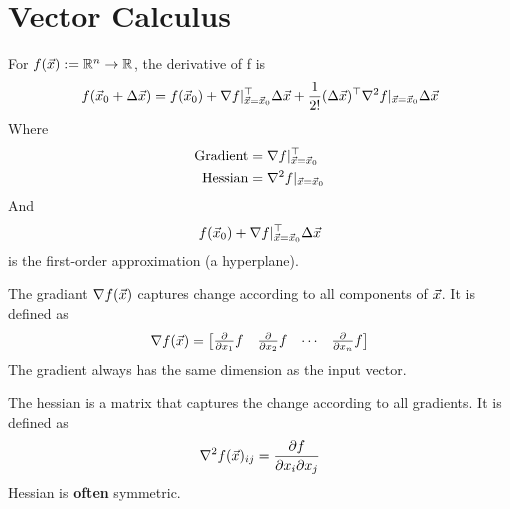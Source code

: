 \section{Vector Calculus} %
\label{sec:vector_calculus}

\begin{theorem}
	For $f(\v{x}):=\mathbb{R}^n\rightarrow\mathbb{R}$, the derivative of f is
	\[
f(\v{x}_0+\Delta\v{x}) = f(\v{x}_0)+\nabla f|^\top_{\v{x}=\v{x}_0}\Delta\v{x} + \frac{1}{2!}(\Delta\v{x})^\top\nabla^2f|_{\v{x}=\v{x}_0}\Delta\v{x}
	\]
	Where
	\begin{align*}
		\text{Gradient} &= \nabla f|^\top_{\v{x}=\v{x}_0}\\
		\text{Hessian} &= \nabla^2f|_{\v{x}=\v{x}_0}
	\end{align*}
	And
	\[
	f(\v{x}_0)+\nabla f|^\top_{\v{x}=\v{x}_0}\Delta\v{x}
	\]
	is the first-order approximation (a hyperplane). 
\end{theorem}

\begin{definition}[Gradient]
	The gradiant $\nabla f(\v{x})$ captures change according to all components of $\v{x}$. It is defined as
	\[
\nabla f(\v{x}) = \begin{bmatrix}
	\pd{f}{x_1} & \pd{f}{x_2} & \cdots & \pd{f}{x_n}
\end{bmatrix}
	\]
	The gradient always has the same dimension as the input vector.
\end{definition}

\begin{definition}[Hessian]
	The hessian is a matrix that captures the change according to all gradients. It is defined as
	\[
\nabla^2 f(\v{x})_{ij} = \frac{\partial f}{\partial x_i\partial x_j}
	\]
	Hessian is \textbf{often} symmetric.
\end{definition}

